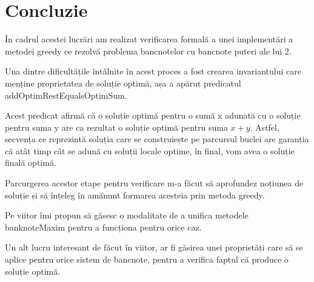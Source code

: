 \chapter*{Concluzie} 

În cadrul acestei lucrări am realizat verificarea formală a unei implementări a metodei greedy ce rezolvă problema 
bancnotelor cu bancnote puteri ale lui 2.\par
Una dintre dificultățile întâlnite în acest proces a fost crearea invariantului care menține proprietatea de soluție
optimă, așa a apărut predicatul addOptimRestEqualsOptimSum.\par
Acest predicat afirmă că o soluție optimă pentru o sumă x adunată cu o soluție pentru suma y are ca rezultat o 
soluție optimă pentru suma $x+y$. Astfel, secvența ce reprezintă soluția care se construiește pe parcursul buclei 
are garanția că atât timp cât se adună cu soluții locale optime, în final, vom avea o soluție finală optimă.\par
Parcurgerea acestor etape pentru verificare m-a făcut să aprofundez noțiunea de soluție și să înțeleg în amănunt 
formarea acesteia prin metoda greedy.\par
Pe viitor îmi propun să găsesc o modalitate de a unifica metodele banknoteMaxim pentru a funcționa pentru orice caz.\par
Un alt lucru interesant de făcut în viitor, ar fi găsirea unei proprietăți care să se aplice pentru orice sistem 
de bancnote, pentru a verifica faptul că produce o soluție optimă.
 